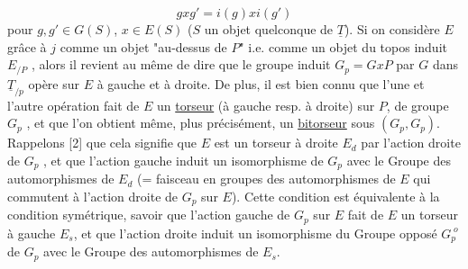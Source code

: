 \begin{equation*}
gxg' = i(g)xi(g')
\end{equation*}
pour $g,g' \in G(S)$, $x \in E(S)$ ($S$ un objet quelconque de $\underline{T}$). Si on considère $E$ grâce à $j$ comme un objet "au-dessus de $P$" i.e. comme un objet du topos induit $E_{/P}$ , alors il revient au même de dire que le groupe induit $G_p = GxP$ par $G$ dans $\underline{T}_{/p}$ opère sur $E$ à gauche et à droite. De plus, il est bien connu que l'une et l'autre opération fait de $E$ un \underline{torseur} (à gauche resp. à droite) sur $P$, de groupe $G_p$ , et que l'on obtient même, plus précisément, un \underline{bitorseur} sous $(G_p,G_p)$. Rappelons [2] que cela signifie que $E$ est un torseur à droite $E_d$ par l'action droite de $G_p$ , et que l'action gauche induit un isomorphisme de $G_p$ avec le Groupe des automorphismes de $E_d$ (= faisceau en groupes des automorphismes de $E$ qui commutent à l'action droite de $G_p$ sur $E$). Cette condition est équivalente à la condition symétrique, savoir que l'action gauche de $G_p$ sur $E$ fait de $E$ un torseur à gauche $E_s$, et que l'action droite induit un isomorphisme du Groupe opposé $G_p^{\;o}$ de $G_p$ avec le Groupe des automorphismes de $E_s$.

